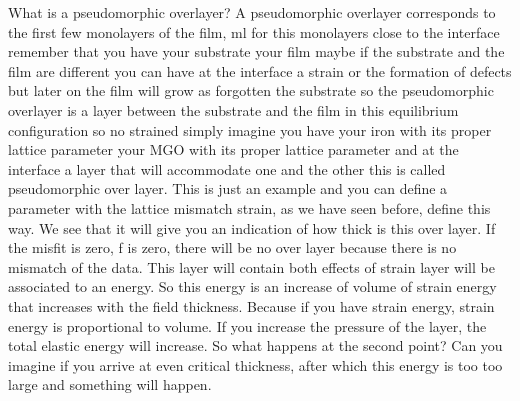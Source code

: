What is a pseudomorphic overlayer? A pseudomorphic overlayer corresponds to the first few monolayers of the film, ml for this monolayers close to the interface remember that you have your substrate your film maybe if the substrate and the film are different you can have at the interface a strain or the formation of defects but later on the film will grow as forgotten the substrate so the pseudomorphic overlayer is a layer between the substrate and the film in this equilibrium configuration so no strained simply imagine you have your iron with its proper lattice parameter your MGO with its proper lattice parameter and at the interface a layer that will accommodate one and the other this is called pseudomorphic over layer. This is just an example and you can define a parameter with the lattice mismatch strain, as we have seen before, define this way. We see that it will give you an indication of how thick is this over layer. If the misfit is zero, f is zero, there will be no over layer because there is no mismatch of the data. This layer will contain both effects of strain layer will be associated to an energy. So this energy is an increase of volume of strain energy that increases with the field thickness. Because if you have strain energy, strain energy is proportional to volume. If you increase the pressure of the layer, the total elastic energy will increase. So what happens at the second point? Can you imagine if you arrive at even critical thickness, after which this energy is too too large and something will happen.
